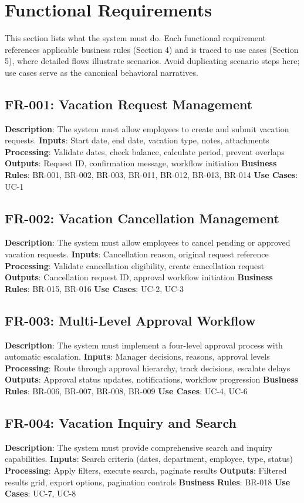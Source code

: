 \documentclass[12pt,a4paper]{article}
\begin{document}
\section{Functional Requirements}

This section lists what the system must do. Each functional requirement references applicable business rules (Section 4) and is traced to use cases (Section 5), where detailed flows illustrate scenarios. Avoid duplicating scenario steps here; use cases serve as the canonical behavioral narratives.

\subsection{FR-001: Vacation Request Management}
\textbf{Description}: The system must allow employees to create and submit vacation requests.
\textbf{Inputs}: Start date, end date, vacation type, notes, attachments
\textbf{Processing}: Validate dates, check balance, calculate period, prevent overlaps
\textbf{Outputs}: Request ID, confirmation message, workflow initiation
\textbf{Business Rules}: BR-001, BR-002, BR-003, BR-011, BR-012, BR-013, BR-014
\textbf{Use Cases}: UC-1

\subsection{FR-002: Vacation Cancellation Management}
\textbf{Description}: The system must allow employees to cancel pending or approved vacation requests.
\textbf{Inputs}: Cancellation reason, original request reference
\textbf{Processing}: Validate cancellation eligibility, create cancellation request
\textbf{Outputs}: Cancellation request ID, approval workflow initiation
\textbf{Business Rules}: BR-015, BR-016
\textbf{Use Cases}: UC-2, UC-3

\subsection{FR-003: Multi-Level Approval Workflow}
\textbf{Description}: The system must implement a four-level approval process with automatic escalation.
\textbf{Inputs}: Manager decisions, reasons, approval levels
\textbf{Processing}: Route through approval hierarchy, track decisions, escalate delays
\textbf{Outputs}: Approval status updates, notifications, workflow progression
\textbf{Business Rules}: BR-006, BR-007, BR-008, BR-009
\textbf{Use Cases}: UC-4, UC-6

\subsection{FR-004: Vacation Inquiry and Search}
\textbf{Description}: The system must provide comprehensive search and inquiry capabilities.
\textbf{Inputs}: Search criteria (dates, department, employee, type, status)
\textbf{Processing}: Apply filters, execute search, paginate results
\textbf{Outputs}: Filtered results grid, export options, pagination controls
\textbf{Business Rules}: BR-018
\textbf{Use Cases}: UC-7, UC-8
\end{document}
